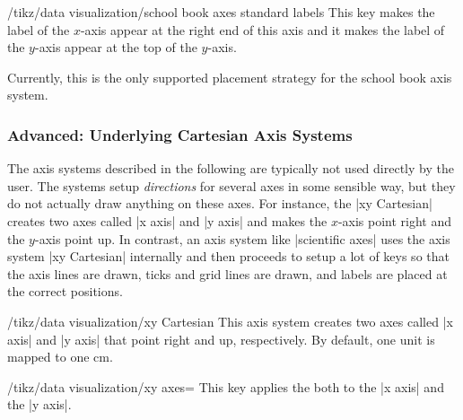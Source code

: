 \begin{key}{/tikz/data visualization/school book axes standard labels}
  This key makes the label of the $x$-axis appear at the right end of
  this axis and it makes the label of the $y$-axis appear at the top
  of the $y$-axis.

  Currently, this is the only supported placement strategy for the
  school book axis system.
\begin{codeexample}[]
\end{codeexample}
\end{key}





\subsubsection{Advanced: Underlying Cartesian Axis Systems}

The axis systems described in the following are typically not used
directly by the user. The systems setup \emph{directions} for several
axes in some sensible way, but they do not actually draw anything on
these axes. For instance, the |xy Cartesian| creates two axes called
|x axis| and |y axis| and makes the $x$-axis point right and the
$y$-axis point up. In contrast, an axis system like |scientific axes|
uses the axis system |xy Cartesian| internally and then proceeds to
setup a lot of keys so that the axis lines are drawn,
ticks and grid lines are drawn, and labels are placed at the correct
positions.

\begin{key}{/tikz/data visualization/xy Cartesian}
  This axis system creates two axes called |x axis| and |y axis| that
  point right and up, respectively. By default, one unit is mapped to
  one cm.

\begin{codeexample}[]
\end{codeexample}


  \begin{key}{/tikz/data visualization/xy axes=}
    This key applies the  both to the |x axis| and the
    |y axis|.
  \end{key}

\end{key}


